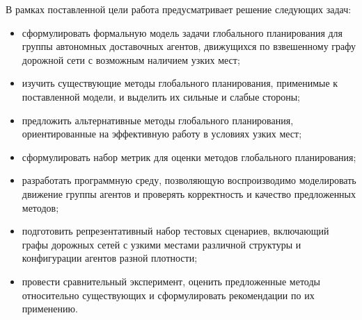 В рамках поставленной цели работа предусматривает решение следующих задач:

\begin{itemize}
\item сформулировать формальную модель задачи глобального планирования для
      группы автономных доставочных агентов, движущихся по взвешенному
      графу дорожной сети с возможным наличием узких мест;
\item изучить существующие методы глобального планирования, применимые к
      поставленной модели, и выделить их сильные и слабые стороны;
\item предложить альтернативные методы глобального планирования,
      ориентированные на эффективную работу в условиях узких мест;
\item сформулировать набор метрик для оценки методов глобального
      планирования;
\item разработать программную среду, позволяющую воспроизводимо
      моделировать движение группы агентов и проверять корректность и
      качество предложенных методов;
\item подготовить репрезентативный набор тестовых сценариев,
      включающий графы дорожных сетей с узкими местами различной
      структуры и конфигурации агентов разной плотности;
\item провести сравнительный эксперимент, оценить предложенные методы
      относительно существующих и сформулировать рекомендации по их
      применению.
\end{itemize}
